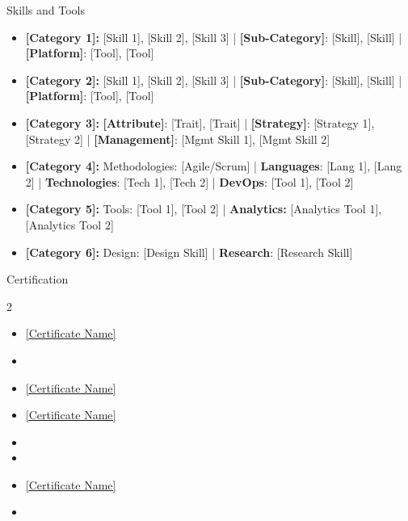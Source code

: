 \documentclass{resume} %
\begin{document}
\begin{rSection}{Skills and Tools}

\begin{itemize}[left=-1.5em, labelsep=.1cm, labelwidth=.2cm, itemsep=0.0em]
    \item \textbf{[Category 1]:} [Skill 1], [Skill 2], [Skill 3] | \textbf{[Sub-Category]}: [Skill], [Skill] | \textbf{[Platform]}: [Tool], [Tool]
    \item \textbf{[Category 2]:} [Skill 1], [Skill 2], [Skill 3] | \textbf{[Sub-Category]}: [Skill], [Skill] | \textbf{[Platform]}: [Tool], [Tool]
    \item \textbf{[Category 3]:} \textbf{[Attribute]}: [Trait], [Trait] | \textbf{[Strategy]}: [Strategy 1], [Strategy 2] | \textbf{[Management]}: [Mgmt Skill 1], [Mgmt Skill 2]
    \item \textbf{[Category 4]:} Methodologies: [Agile/Scrum] | \textbf{Languages}: [Lang 1], [Lang 2] | \textbf{Technologies}: [Tech 1], [Tech 2] | \textbf{DevOps}: [Tool 1], [Tool 2]
      \item \textbf{[Category 5]:} Tools: [Tool 1], [Tool 2] | \textbf{Analytics:} [Analytics Tool 1], [Analytics Tool 2] 
    \item \textbf{[Category 6]:} Design: [Design Skill] | \textbf{Research}: [Research Skill]
    
\end{itemize}

\end{rSection}


\vspace{0.5em}
\begin{rSection}{Certification}
\setlength{\columnsep}{2em}
\begin{multicols}{2}
\begin{itemize}[left=-1.5em, labelwidth=.1cm, itemsep=0.0em]
\item \href{[Certificate URL]}{[Certificate Name]}
\item [Certificate Name]
\item \href{[Certificate URL]}{[Certificate Name]}
\item \href{[Certificate URL]}{[Certificate Name]}
\item [Certificate Name]
\item [Certificate Name]
\item \href{[Certificate URL]}{[Certificate Name]}
\item [Certificate Name]

\end{itemize}
\end{multicols}
\end{rSection}
\vspace{0.5 em}
\end{document}
